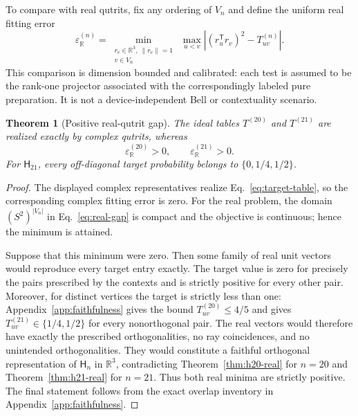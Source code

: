 \documentclass[twocolumn,aps,pra,floatfix,amsmath,amssymb,longbibliography]{revtex4-2}
\newtheorem{theorem}{Theorem}
\theoremstyle{definition}
\theoremstyle{remark}
\newcommand{\R}{\mathbb R}
\newcommand{\Htwentyone}{\mathsf H_{21}}
\begin{document}
To compare with real qutrits, fix any ordering of $V_n$ and define the
uniform real fitting error
\begin{equation}
 \varepsilon_{\R}^{(n)}=
 \min_{\substack{r_v\in\R^3,\ \|r_v\|=1\\v\in V_n}}
 \ \max_{u<v}
 \left| (r_u^{\mathsf T}r_v)^2-T_{uv}^{(n)}\right|.
 \label{eq:real-gap}
\end{equation}
This comparison is dimension bounded and calibrated: each test is assumed to
be the rank-one projector associated with the correspondingly labeled pure
preparation.  It is not a device-independent Bell or contextuality scenario.

\begin{theorem}[Positive real-qutrit gap]
\label{thm:operational-gap}
The ideal tables $T^{(20)}$ and $T^{(21)}$ are realized exactly by complex
qutrits, whereas
\begin{equation}
 \varepsilon_{\R}^{(20)}>0,
 \qquad
 \varepsilon_{\R}^{(21)}>0.
 \label{eq:positive-gaps}
\end{equation}
For $\Htwentyone$, every off-diagonal target probability belongs to
$\{0,1/4,1/2\}$.
\end{theorem}

\begin{proof}
The displayed complex representatives realize Eq.~\eqref{eq:target-table}, so
the corresponding complex fitting error is zero.  For the real problem, the
domain $(S^2)^{|V_n|}$ in Eq.~\eqref{eq:real-gap} is compact and the objective
is continuous; hence the minimum is attained.

Suppose that this minimum were zero.  Then some family of real unit vectors
would reproduce every target entry exactly.  The target value is zero for
precisely the pairs prescribed by the contexts and is strictly positive for
every other pair.  Moreover, for distinct vertices the target is strictly
less than one: Appendix~\ref{app:faithfulness} gives the bound $T_{uv}^{(20)}
\le4/5$ and gives $T_{uv}^{(21)}\in\{1/4,1/2\}$ for every nonorthogonal pair.
The real vectors would therefore have exactly the prescribed
orthogonalities, no ray coincidences, and no unintended orthogonalities.
They would constitute a faithful orthogonal representation of
$\mathsf H_n$ in $\R^3$, contradicting Theorem~\ref{thm:h20-real} for $n=20$
and Theorem~\ref{thm:h21-real} for $n=21$.  Thus both real minima are strictly
positive.  The final statement follows from the exact overlap inventory in
Appendix~\ref{app:faithfulness}.
\end{proof}
\end{document}
